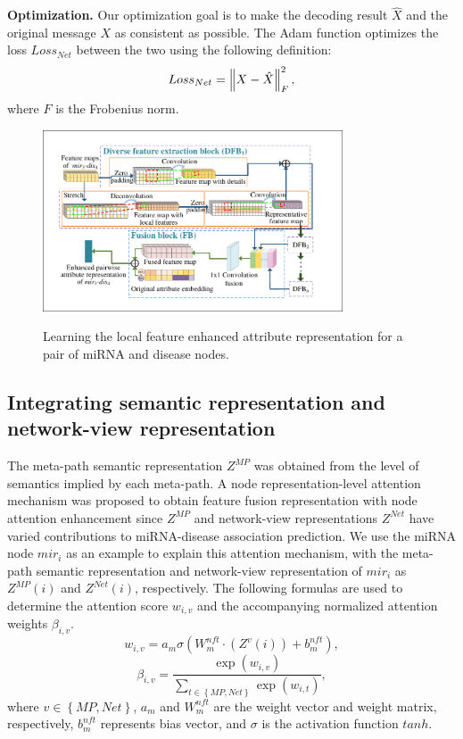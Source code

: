 \documentclass[journal,twoside,web]{ieeecolor}
\begin{document}
\textbf{Optimization.} Our optimization goal is to make the decoding result $\hat X$ and the original message $X$ as consistent as possible. The Adam function optimizes the loss $Los{s_{Net}}$ between the two using the following definition:
\begin{equation}
Los{s_{Net}} = \left\| {{\rm{ }}X - \hat X} \right\|_F^2,
\end{equation}
where $F$ is the Frobenius norm.

\begin{figure}
	\centering
	\includegraphics[width=3.5in]{fig/fig-3.pdf}\\
	\caption{ Learning the local feature enhanced attribute representation for a pair of miRNA and disease nodes.}
	\label{fig:03}
	\vspace{-0.4cm}
\end{figure}
\subsection{Integrating semantic representation and network-view representation}

The meta-path semantic representation ${Z^{MP}}$ was obtained from the level of semantics implied by each meta-path. A node representation-level attention mechanism was proposed to obtain feature fusion representation with node attention enhancement since ${Z^{MP}}$ and network-view representations ${Z^{Net}}$ have varied contributions to miRNA-disease association prediction. We use the miRNA node $mi{r_i}$ as an example to explain this attention mechanism, with the meta-path semantic representation and network-view representation of $mi{r_i}$ as ${Z^{MP}}\left( i \right)$ and ${Z^{Net}}\left( i \right)$, respectively. 
The following formulas are used to determine the attention score ${w_{i,v}}$ and the accompanying normalized attention weights ${\beta _{i,v}}$.
\begin{equation}
{w_{i,v}} = {a_m}\sigma \left( {W_m^{nft} \cdot \left( {{Z^v}\left( i \right)} \right) + b_m^{nft}} \right),
\end{equation}
\begin{equation}
{\beta _{i,v}} = \frac{{\exp \left( {{w_{i,v}}} \right)}}{{\sum\nolimits_{t \in \left\{ {MP,Net} \right\}} {\exp \left( {{w_{i,t}}} \right)} }},
\end{equation}
where $v \in \left\{ {MP,Net} \right\}$, ${a_m}$ and $W_m^{nft}$ are the weight vector and weight matrix, respectively, $b_m^{nft}$ represents bias vector, and $\sigma $ is the activation function $tanh$. 
\end{document}
